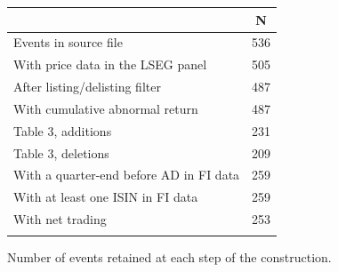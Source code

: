 \begin{threeparttable}
\begingroup
\renewcommand\cellalign{t}
\renewcommand\arraystretch{1}
\setlength{\tabcolsep}{5pt}
\begin{tabular}{@{}lc}
\toprule
 & N \\
\midrule
\addlinespace[1ex]
Events in source file & 536 \\
\addlinespace[0.25ex]
\addlinespace[0.25ex]
With price data in the LSEG panel & 505 \\
\addlinespace[0.25ex]
\addlinespace[0.25ex]
After listing/delisting filter & 487 \\
\addlinespace[0.25ex]
\addlinespace[0.25ex]
With cumulative abnormal return & 487 \\
\addlinespace[0.25ex]
\addlinespace[0.25ex]
Table 3, additions & 231 \\
\addlinespace[0.25ex]
\addlinespace[0.25ex]
Table 3, deletions & 209 \\
\addlinespace[0.25ex]
\addlinespace[0.25ex]
With a quarter-end before AD in FI data & 259 \\
\addlinespace[0.25ex]
\addlinespace[0.25ex]
With at least one ISIN in FI data & 259 \\
\addlinespace[0.25ex]
\addlinespace[0.25ex]
With net trading & 253 \\
\addlinespace[0.25ex]
\bottomrule
\end{tabular}
\endgroup
\noindent\begin{minipage}{\linewidth}\smallskip\footnotesize
Number of events retained at each step of the construction.\end{minipage}

\end{threeparttable}